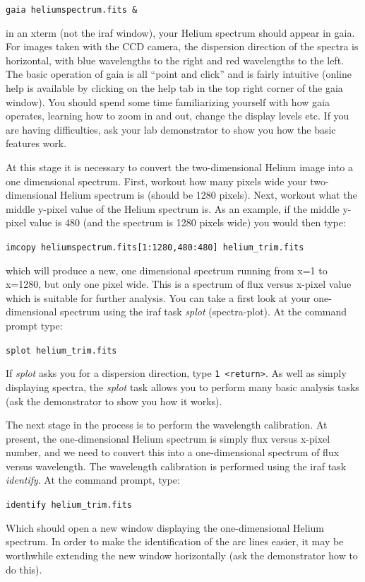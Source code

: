 \documentclass[12pt]{article}
\begin{document}
{\tt gaia heliumspectrum.fits \&}

in an xterm (not the {\sc iraf} window), your Helium spectrum should appear in {\sc gaia}. For images taken with the CCD camera, the 
dispersion direction of the spectra is horizontal, with blue
wavelengths to the right and red wavelengths to the left. The basic
operation of {\sc gaia} is all ``point and
click'' and is fairly intuitive (online help is available by
clicking on the {\sc help} tab in the top right corner of the {\sc
gaia} window). You should spend some time familiarizing yourself with
how {\sc gaia} operates, learning how to zoom in and out, change the
display levels etc. If you are having difficulties, ask your lab
demonstrator to show you how the basic features work.

At this stage it is necessary to convert the two-dimensional Helium
image into a one dimensional spectrum. First, workout how many pixels
wide your two-dimensional Helium spectrum is (should be 1280 pixels). Next, workout what
the middle y-pixel value of the Helium spectrum is. As an example, if
the middle y-pixel value is 480 (and the spectrum is 1280 pixels wide) you would then type:

{\tt imcopy heliumspectrum.fits[1:1280,480:480] helium\verb,_,trim.fits}

which will produce a new, one dimensional spectrum running from x=1
to x=1280, but only one pixel wide. This is a spectrum of flux versus
x-pixel value which is suitable for further analysis. You can take a
first look at your one-dimensional spectrum using the {\sc iraf} task 
{\it splot} (spectra-plot). At the command prompt type:

{\tt splot helium\verb,_trim,.fits}

If {\it splot} asks you for a dispersion direction, type {\tt 1
  <return>}. As well as simply displaying spectra, the {\it splot} task allows you
to perform many basic analysis tasks (ask the demonstrator to show you
how it works).


The next stage in the process is to perform the wavelength
calibration. At present, the one-dimensional Helium spectrum is 
simply flux versus x-pixel number, and we need to convert this into a 
one-dimensional spectrum of flux versus wavelength. The wavelength
calibration is performed using the {\sc iraf} task {\it identify}. 
At the command prompt, type:

{\tt identify helium\verb,_trim,.fits}

Which should open a new window displaying the one-dimensional Helium
spectrum. In order to make the identification of the arc lines easier, it
may be worthwhile extending the new window horizontally (ask the
demonstrator how to do this).
\end{document}
